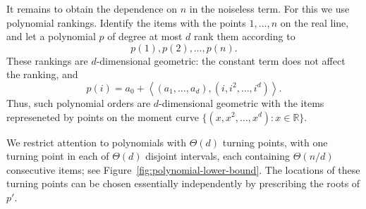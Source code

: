 \documentclass[11pt]{article}
\theoremstyle{definition}
\theoremstyle{remark}
\begin{document}
It remains to obtain the dependence on $n$ in the noiseless term. For this
we use polynomial rankings. Identify the items with the points
$1,\ldots,n$ on the real line, and let a polynomial $p$ of degree at most
$d$ rank them according to
\[
    p(1),p(2),\ldots,p(n).
\]
These rankings are $d$-dimensional geometric: the constant term does not
affect the ranking, and
\[
    p(i)
    =
    a_0+\left\langle
        (a_1,\ldots,a_d),(i,i^2,\ldots,i^d)
    \right\rangle.
\]
Thus, such polynomial orders are $d$-dimensional geometric with the items represeneted by points on the moment curve $\{(x,x^2,\ldots,x^d) : x\in\mathbb{R}\}$.

We restrict attention to polynomials with $\Theta(d)$ turning points, with
one turning point in each of $\Theta(d)$ disjoint intervals, each containing
$\Theta(n/d)$ consecutive items; see
Figure~\ref{fig:polynomial-lower-bound}. The locations of these turning
points can be chosen essentially independently by prescribing the roots of
$p'$.
\end{document}
